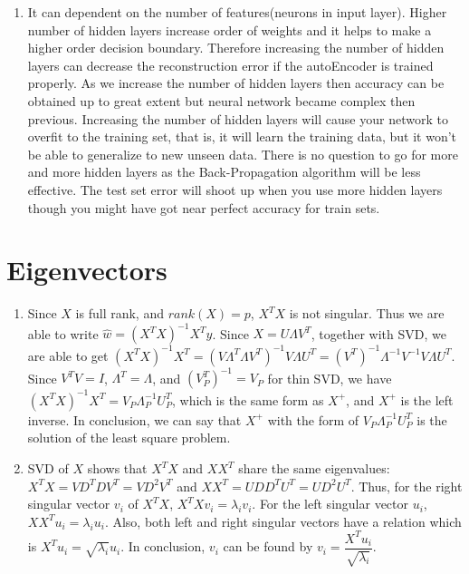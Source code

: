 \documentclass[english]{article}
\begin{document}
\begin{enumerate}
    \item It can dependent on the number of features(neurons in input layer). Higher number of hidden layers increase order of weights and it helps to make a higher order decision boundary. Therefore increasing the number of hidden layers can decrease the reconstruction error if the autoEncoder is trained properly. As we increase the number of hidden layers then accuracy can be obtained up to great extent but neural network became complex then previous. Increasing the number of hidden layers will cause your network to overfit to the training set, that is, it will learn the training data, but it won't be able to generalize to new unseen data. There is no question to go for more and more hidden layers as the Back-Propagation algorithm will be less effective. The test set error will shoot up when you use more hidden layers though you might have got near perfect accuracy for train sets.

 \end{enumerate}
 \clearpage
 \section{Eigenvectors}
 \begin{enumerate}
    \item Since $X$ is full rank, and $rank(X) = p$, $X^TX$ is not singular. Thus we are able to write $\hat{w} = (X^TX)^{-1}X^Ty$. Since $X = U\Lambda V^T$, together with SVD, we are able to get $(X^TX)^{-1}X^T = (V\Lambda^T\Lambda V^T)^{-1}V\Lambda U^T = (V^T)^{-1}\Lambda^{-1}V^{-1}V\Lambda U^T$. Since $V^TV = I$, $\Lambda^T = \Lambda$, and $(V_P^T)^{-1} = V_P$ for thin SVD, we have $(X^TX)^{-1}X^T = V_P\Lambda_P^{-1}U_P^T$, which is the same form as $X^+$, and $X^+$ is the left inverse. In conclusion, we can say that $X^+$ with the form of $V_P\Lambda_P^{-1}U_P^T$ is the solution of the least square problem.
    \clearpage
    \item SVD of $X$ shows that $X^TX$ and $XX^T$ share the same eigenvalues: $X^TX = VD^TDV^T = VD^2V^T$ and $XX^T = UDD^TU^T = UD^2U^T$. Thus, for the right singular vector $v_i$ of $X^TX$, $X^TXv_i = \lambda_i v_i$. For the left singular vector $u_i$, $XX^Tu_i = \lambda_i u_i$. Also, both left and right singular vectors have a relation which is $X^T u_i = \sqrt{\lambda_i}u_i$. In conclusion, $v_i$ can be found by $v_i = \dfrac{X^T u_i}{\sqrt{\lambda_i}}.$
 \end{enumerate}
\end{document}
